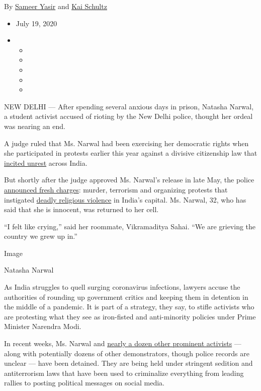 By \href{https://www.nytimes3xbfgragh.onion/by/sameer-yasir}{Sameer
Yasir} and \href{https://www.nytimes3xbfgragh.onion/by/kai-schultz}{Kai
Schultz}

\begin{itemize}
\item
  July 19, 2020
\item
  \begin{itemize}
  \item
  \item
  \item
  \item
  \item
  \end{itemize}
\end{itemize}

NEW DELHI --- After spending several anxious days in prison, Natasha
Narwal, a student activist accused of rioting by the New Delhi police,
thought her ordeal was nearing an end.

A judge ruled that Ms. Narwal had been exercising her democratic rights
when she participated in protests earlier this year against a divisive
citizenship law that
\href{https://www.nytimes3xbfgragh.onion/2019/12/22/world/asia/modi-india-citizenship-law.html}{incited
unrest} across India.

But shortly after the judge approved Ms. Narwal's release in late May,
the police
\href{https://scroll.in/latest/963353/delhi-violence-pinjra-tod-member-natasha-narwal-booked-under-uapa}{announced
fresh charges}: murder, terrorism and organizing protests that
instigated
\href{https://www.nytimes3xbfgragh.onion/2020/02/25/world/asia/new-delhi-hindu-muslim-violence.html}{deadly
religious violence} in India's capital. Ms. Narwal, 32, who has said
that she is innocent, was returned to her cell.

``I felt like crying,'' said her roommate, Vikramaditya Sahai. ``We are
grieving the country we grew up in.''

Image

Natasha Narwal

As India struggles to quell surging coronavirus infections, lawyers
accuse the authorities of rounding up government critics and keeping
them in detention in the middle of a pandemic. It is part of a strategy,
they say, to stifle activists who are protesting what they see as
iron-fisted and anti-minority policies under Prime Minister Narendra
Modi.

In recent weeks, Ms. Narwal and
\href{https://www.ohchr.org/EN/NewsEvents/Pages/DisplayNews.aspx?NewsID=26002\&LangID=E}{nearly
a dozen other prominent activists} --- along with potentially dozens of
other demonstrators, though police records are unclear --- have been
detained. They are being held under stringent sedition and antiterrorism
laws that have been used to criminalize everything from leading rallies
to posting political messages on social media.

